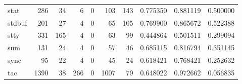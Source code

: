 \begin{longtable}{lrrrrrrrrr}
stat      &                                                286 &                                                 34 &                                                  6 &                                                  0 &                                                103 &                                                143 &                                           0.775350 &                               0.881119 &                             0.500000 \\
stdbuf    &                                                201 &                                                 27 &                                                  4 &                                                  0 &                                                 65 &                                                105 &                                           0.769900 &                               0.865672 &                             0.522388 \\
stty      &                                                331 &                                                165 &                                                  4 &                                                  0 &                                                 63 &                                                 99 &                                           0.444864 &                               0.501511 &                             0.299094 \\
sum       &                                                131 &                                                 24 &                                                  4 &                                                  0 &                                                 57 &                                                 46 &                                           0.685115 &                               0.816794 &                             0.351145 \\
sync      &                                                 95 &                                                 22 &                                                  4 &                                                  0 &                                                 45 &                                                 24 &                                           0.618421 &                               0.768421 &                             0.252632 \\
tac       &                                               1390 &                                                 38 &                                                266 &                                                  0 &                                               1007 &                                                 79 &                                           0.648022 &                               0.972662 &                             0.056835 \\

\end{longtable}
